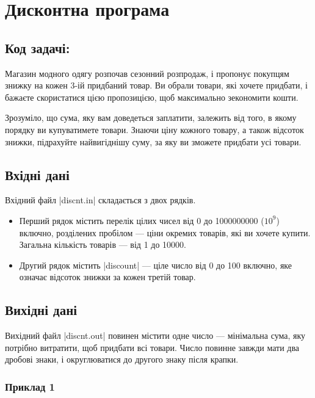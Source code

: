 \documentclass[12pt,a4paper]{article}
\begin{document}
\section*{Дисконтна програма \hfill {}}


\subsection*{Код задачі: }

Магазин модного одягу розпочав сезонний розпродаж, і пропонує покупцям знижку на кожен 3-ій придбаний товар.
Ви обрали товари, які хочете придбати, і бажаєте скористатися цією пропозицією, щоб максимально зекономити кошти.

Зрозуміло, що сума, яку вам доведеться заплатити, залежить від того, в якому порядку ви купуватимете товари.
Знаючи ціну кожного товару, а також відсоток знижки, підрахуйте найвигіднішу суму, за яку ви зможете придбати усі товари.


\subsection*{Вхідні дані}

Вхідний файл |discnt.in| складається з двох рядків.

\begin{itemize}
    \item Перший рядок містить перелік цілих чисел від 0 до 1000000000 (\(10 ^ 9\)) включно, розділених пробілом --- ціни окремих товарів, які ви хочете купити. Загальна кількість товарів --- від 1 до 10000.
    \item Другий рядок містить |discount| --- ціле число від 0 до 100 включно, яке означає відсоток знижки за кожен третій товар.
\end{itemize}


\subsection*{Вихідні дані}

Вихідний файл |discnt.out| повинен містити одне число --- мінімальна сума, яку потрібно витратити, щоб придбати всі товари. Число повинне завжди мати два дробові знаки, і округлюватися до другого знаку після крапки.


\pagebreak


\subsubsection*{Приклад 1}
\end{document}
